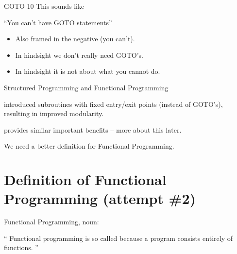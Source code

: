 \documentclass{beamer}
\begin{document}
\begin{frame}{GOTO 10}
    This sounds like
  \begin{exampleblock}{}
    {\Large ``You can't have GOTO statements''}
  \end{exampleblock}
  \vskip5mm
  \hspace*{}

  \begin{itemize}[<+->]
  \item Also framed in the negative (you can't).
  \item In hindsight we don't really need GOTO's.
  \item In hindsight it is not about what you cannot do.
  \end{itemize}
\end{frame}

\begin{frame}{Structured Programming and Functional Programming}
  \begin{description}[<+->]
  \item[Structured Programming] introduced subroutines with fixed
    entry/exit points (instead of GOTO's), resulting in improved
    modularity.
  \item[Functional Programming] provides similar important benefits --
    more about this later.
  \end{description}
\end{frame}

\begin{frame}{}

  {\Large We need a better definition for Functional Programming.}

\end{frame}

\section{Definition of Functional Programming (attempt \#2)}

\begin{frame}{Functional Programming, noun:}

\begin{exampleblock}{}
  {\Large ``
  Functional programming is so called because a program consists entirely of functions.
  ''}
  \vskip5mm
  \hspace*{}
\end{exampleblock}
\end{frame}
\end{document}
